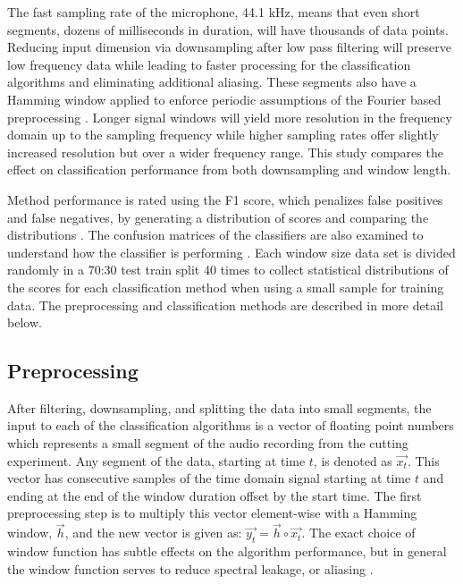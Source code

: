 The fast sampling rate of the microphone, 44.1 kHz, means that even short segments,
dozens of milliseconds in duration, will have thousands of data points.
Reducing input dimension via downsampling after low pass filtering will preserve 
low frequency data while leading to faster processing for the classification algorithms and 
eliminating additional aliasing.
These segments also have a Hamming window applied 
to enforce periodic assumptions of the Fourier based preprocessing \cite{prabhu2014window}.
Longer signal windows will yield more resolution in the frequency domain up to the sampling frequency
while higher sampling rates offer slightly increased resolution but over a wider frequency range.
This study compares the effect on classification performance from both downsampling and window length.

Method performance is rated using the F1 score, which penalizes false positives and false negatives,
by generating a distribution of scores and comparing the distributions \cite{Goutte2005}.
The confusion matrices of the classifiers are also examined to understand 
how the classifier is performing \cite{Bramer2007}.
Each window size data set is divided randomly in a 70:30 test train split 40 times 
to collect statistical distributions of the scores for each classification method 
when using a small sample for training data.
The preprocessing and classification methods are described in more detail below.

\subsection{Preprocessing}

After filtering, downsampling, and splitting the data into small segments,
the input to each of the classification algorithms is a vector of floating point numbers 
which represents a small segment of the audio recording from the cutting experiment. 
Any segment of the data, starting at time $t$, is denoted as $\vec{x_t}$.
This vector has consecutive samples of the time domain signal starting at time $t$ and 
ending at the end of the window duration offset by the start time.
The first preprocessing step is to multiply this vector element-wise with a Hamming window, $\vec{h}$, and
the new vector is given as: $\vec{y_t} = \vec{h} \circ \vec{x_t}$.
The exact choice of window function has subtle effects on the algorithm performance, 
but in general the window function serves to reduce spectral leakage, or aliasing \cite{Harris1978}. 


